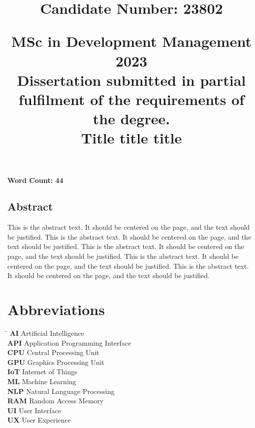 \documentclass{article}%
\title{
        \begin{flushright}
        \large \textbf{Candidate Number: 23802}
        \end{flushright}
        \vspace*{30mm}
        \begin{center}
        \large MSc in Development Management 2023 \\
        \vspace*{5mm}
        Dissertation submitted in partial fulfilment of the requirements of the degree. \\
        \vspace*{35mm}
        \Huge \textbf{Title title title} \\
        \vspace*{20mm}
        \end{center}
    }%
\date{}%
\begin{document}
%
\normalsize%
%
\pagestyle{frontmatter}%
\maketitle%

\vfill
\begin{center}\textbf{Word Count: 44}\end{center}
\newpage%
\vspace*{\fill}%
\begin{center}%
\begin{minipage}{0.8\textwidth}%
\begin{center}%
\section*{Abstract}%
\end{center}%
\justify%
This is the abstract text. It should be centered on the page, and the text should be justified. This is the abstract text. It should be centered on the page, and the text should be justified. This is the abstract text. It should be centered on the page, and the text should be justified. This is the abstract text. It should be centered on the page, and the text should be justified. This is the abstract text. It should be centered on the page, and the text should be justified. %
\end{minipage}%
\end{center}%
\vspace*{\fill}%
\newpage%
\tableofcontents%
\newpage%
\section*{Abbreviations}%
\label{sec:Abbreviations}%
\begin{tabbing}%
\hspace{3cm} \= \kill%
\textbf{AI} \> Artificial Intelligence \\%
\textbf{API} \> Application Programming Interface \\%
\textbf{CPU} \> Central Processing Unit \\%
\textbf{GPU} \> Graphics Processing Unit \\%
\textbf{IoT} \> Internet of Things \\%
\textbf{ML} \> Machine Learning \\%
\textbf{NLP} \> Natural Language Processing \\%
\textbf{RAM} \> Random Access Memory \\%
\textbf{UI} \> User Interface \\%
\textbf{UX} \> User Experience \\%
\end{tabbing}
\end{document}
